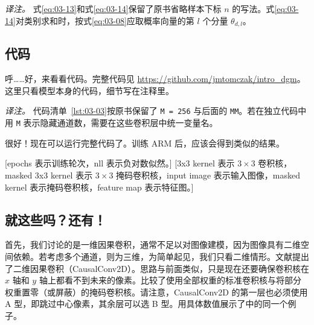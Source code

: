\emph{译注。} 式\eqref{eq:03-13}和式\eqref{eq:03-14}保留了原书省略样本下标 $n$ 的写法。式\eqref{eq:03-14}对类别求和时，按式\eqref{eq:03-08}应取概率向量的第 $l$ 个分量 $\theta_{d,l}$。


\subsection{代码}

呼……好，来看看代码。完整代码见 \url{https://github.com/jmtomczak/intro_dgm}。这里只看模型本身的代码，细节写在注释里。


\emph{译注。} 代码清单~\ref{lst:03-03}按原书保留了 \texttt{M = 256} 与后面的 \texttt{MM}。若在独立代码中用 \texttt{M} 表示隐藏通道数，需要在这些卷积层中统一变量名。

很好！现在可以运行完整代码了。训练 ARM 后，应该会得到类似的结果。

[epochs 表示训练轮次，nll 表示负对数似然。]
[3x3 kernel 表示 $3\times3$ 卷积核，masked 3x3 kernel 表示 $3\times3$ 掩码卷积核，input image 表示输入图像，masked kernel 表示掩码卷积核，feature map 表示特征图。]

\subsection{就这些吗？还有！}

首先，我们讨论的是一维因果卷积，通常不足以对图像建模，因为图像具有二维空间依赖。若考虑多个通道，则为三维，为简单起见，我们只看二维情形。文献提出了二维因果卷积（CausalConv2D）。思路与前面类似，只是现在还要确保卷积核在 $x$ 轴和 $y$ 轴上都看不到未来的像素。比较了使用全部权重的标准卷积核与将部分权重置零（或屏蔽）的掩码卷积核。请注意，CausalConv2D 的第一层也必须使用 A 型，即跳过中心像素，其余层可以选 B 型。用具体数值展示了中的同一个例子。


